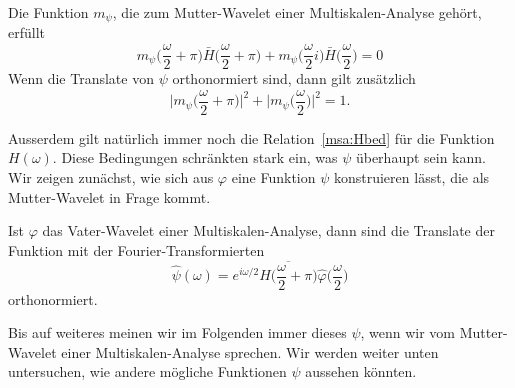 \begin{satz}
Die Funktion $m_\psi$, die zum Mutter-Wavelet einer Multiskalen-Analyse 
gehört, erfüllt
\[
m_{\psi}\biggl(\frac{\omega}2+\pi\biggr)
\bar{H}\biggl(\frac{\omega}2+\pi\biggr)
+
m_{\psi}\biggl(\frac{\omega}2i\biggr)
\bar{H}\biggl(\frac{\omega}2\biggr)
=
0
\]
Wenn die Translate von $\psi$ orthonormiert sind, dann gilt
zusätzlich
\[
\biggl|m_\psi\biggl(\frac{\omega}2+\pi\biggr)\biggr|^2
+
\biggl|m_\psi\biggl(\frac{\omega}2\biggr)\biggr|^2
=
1.
\]
\end{satz}

Ausserdem gilt natürlich immer noch die Relation~\eqref{msa:Hbed}
für die Funktion $H(\omega)$.
Diese Bedingungen schränkten stark ein, was $\psi$ überhaupt sein
kann.
Wir zeigen zunächst, wie sich aus $\varphi$ eine Funktion $\psi$
konstruieren lässt, die als Mutter-Wavelet in Frage kommt.

\begin{lemma}
\label{lemma:msa:psivorschlag}
Ist $\varphi$ das Vater-Wavelet einer Multiskalen-Analyse, dann sind die
Translate der Funktion mit der Fourier-Transformierten
\begin{equation}
\hat{\psi}(\omega)
=
e^{i\omega/2}
\overline{H\biggl(\frac{\omega}2+\pi\biggr)}
\hat{\varphi}\biggl(\frac{\omega}2\biggr)
\label{msa:psivorschlag}
\end{equation}
orthonormiert.
\end{lemma}

Bis auf weiteres meinen wir im Folgenden immer dieses $\psi$, wenn wir
vom Mutter-Wavelet einer Multiskalen-Analyse sprechen.
Wir werden weiter unten untersuchen, wie andere mögliche Funktionen 
$\psi$ aussehen könnten.

